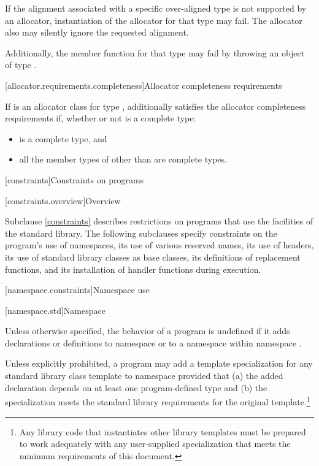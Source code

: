 \pnum
If the alignment associated with a specific over-aligned type is not
supported by an allocator, instantiation of the allocator for that type may
fail. The allocator also may silently ignore the requested alignment.
\begin{note} Additionally, the member function 
for that type may fail by throwing an object of type
.\end{note}

[allocator.requirements.completeness]{Allocator completeness requirements}

\pnum
If  is an allocator class for type ,
 additionally satisfies the allocator completeness requirements if,
whether or not  is a complete type:

\begin{itemize}
\item {} is a complete type, and
\item all the member types of 
  other than  are complete types.
\end{itemize}

[constraints]{Constraints on programs}

[constraints.overview]{Overview}

\pnum
Subclause \ref{constraints} describes restrictions on \Cpp{} programs that use the facilities of
the \Cpp{} standard library. The following subclauses specify constraints on the
program's use of namespaces, its use of various reserved
names, its use of headers, its use of
standard library classes as base classes, its
definitions of replacement functions, and its
installation of handler functions during execution.

[namespace.constraints]{Namespace use}

[namespace.std]{Namespace }

\pnum
Unless otherwise specified,
the behavior of a \Cpp{} program is undefined if it adds declarations or definitions to namespace
or to a namespace within namespace
.

\pnum
Unless explicitly prohibited,
a program may add a template specialization for
any standard library class template
to namespace
 provided that
(a) the added declaration
depends on at least one program-defined type
and
(b) the specialization meets the standard library requirements
for the original template.\footnote{Any
library code that instantiates other library templates
must be prepared to work adequately with any user-supplied specialization
that meets the minimum requirements of this document.}

